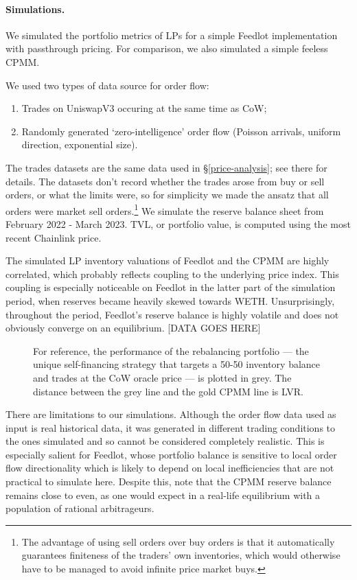 \documentclass[a4paper,10pt]{article}
\theoremstyle{remark}
\begin{document}
\paragraph{Simulations.}

We simulated the portfolio metrics of LPs for a simple Feedlot implementation with passthrough pricing.
%
For comparison, we also simulated a simple feeless CPMM.

We used two types of data source for order flow:
\begin{enumerate}
  \item Trades on UniswapV3 occuring at the same time as CoW;
  \item Randomly generated `zero-intelligence' order flow (Poisson arrivals, uniform direction, exponential size).
\end{enumerate}
The trades datasets are the same data used in \S\ref{price-analysis}; see there for details.
%
The datasets don't record whether the trades arose from buy or sell orders, or what the limits were, so for simplicity we made the ansatz that all orders were market sell orders.\footnote{The advantage of using sell orders over buy orders is that it automatically guarantees finiteness of the traders' own inventories, which would otherwise have to be managed to avoid infinite price market buys.}
%
We simulate the reserve balance sheet from February 2022 - March 2023. 
%
TVL, or portfolio value, is computed using the most recent Chainlink price.

The simulated LP inventory valuations of Feedlot and the CPMM are highly correlated, which probably reflects coupling to the underlying price index.
%
This coupling is especially noticeable on Feedlot in the latter part of the simulation period, when reserves became heavily skewed towards WETH.
%
Unsurprisingly, throughout the period, Feedlot's reserve balance is highly volatile and does not obviously converge on an equilibrium.
[DATA GOES HERE]

\begin{figure}
  \begin{center}
  \caption{For reference, the performance of the rebalancing portfolio --- the unique self-financing strategy that targets a 50-50 inventory balance and trades at the CoW oracle price --- is plotted in grey. The distance between the grey line and the gold CPMM line is LVR.}
  \end{center}
\end{figure}

There are limitations to our simulations. 
%
Although the order flow data used as input is real historical data, it was generated in different trading conditions to the ones simulated and so cannot be considered completely realistic.
%
This is especially salient for Feedlot, whose portfolio balance is sensitive to local order flow directionality which is likely to depend on local inefficiencies that are not practical to simulate here.
%
Despite this, note that the CPMM reserve balance remains close to even, as one would expect in a real-life equilibrium with a population of rational arbitrageurs.
\end{document}

